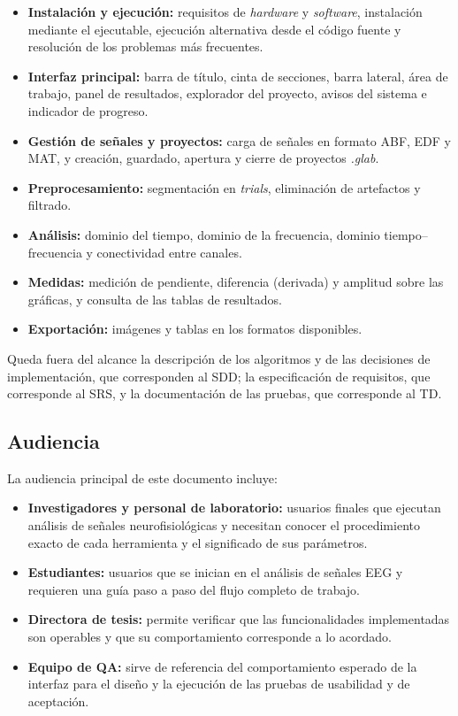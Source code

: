 \documentclass[11pt,a4paper]{article}
\begin{document}
    \begin{itemize}
        \item \textbf{Instalaci\'on y ejecuci\'on:} requisitos de \textit{hardware} y \textit{software}, instalaci\'on mediante el ejecutable, ejecuci\'on alternativa desde el c\'odigo fuente y resoluci\'on de los problemas m\'as frecuentes.
        \item \textbf{Interfaz principal:} barra de t\'itulo, cinta de secciones, barra lateral, \'area de trabajo, panel de resultados, explorador del proyecto, avisos del sistema e indicador de progreso.
        \item \textbf{Gesti\'on de se\~nales y proyectos:} carga de se\~nales en formato ABF, EDF y MAT, y creaci\'on, guardado, apertura y cierre de proyectos \textit{.glab}.
        \item \textbf{Preprocesamiento:} segmentaci\'on en \textit{trials}, eliminaci\'on de artefactos y filtrado.
        \item \textbf{An\'alisis:} dominio del tiempo, dominio de la frecuencia, dominio tiempo--frecuencia y conectividad entre canales.
        \item \textbf{Medidas:} medici\'on de pendiente, diferencia (derivada) y amplitud sobre las gr\'aficas, y consulta de las tablas de resultados.
        \item \textbf{Exportaci\'on:} im\'agenes y tablas en los formatos disponibles.
    \end{itemize}

    Queda fuera del alcance la descripci\'on de los algoritmos y de las decisiones de implementaci\'on, que corresponden al SDD; la especificaci\'on de requisitos, que corresponde al SRS, y la documentaci\'on de las pruebas, que corresponde al TD.

    \subsection{Audiencia}
    La audiencia principal de este documento incluye:
    \begin{itemize}
        \item \textbf{Investigadores y personal de laboratorio:} usuarios finales que ejecutan an\'alisis de se\~nales neurofisiol\'ogicas y necesitan conocer el procedimiento exacto de cada herramienta y el significado de sus par\'ametros.
        \item \textbf{Estudiantes:} usuarios que se inician en el an\'alisis de se\~nales EEG y requieren una gu\'ia paso a paso del flujo completo de trabajo.
        \item \textbf{Directora de tesis:} permite verificar que las funcionalidades implementadas son operables y que su comportamiento corresponde a lo acordado.
        \item \textbf{Equipo de QA:} sirve de referencia del comportamiento esperado de la interfaz para el dise\~no y la ejecuci\'on de las pruebas de usabilidad y de aceptaci\'on.
    \end{itemize}
\end{document}
